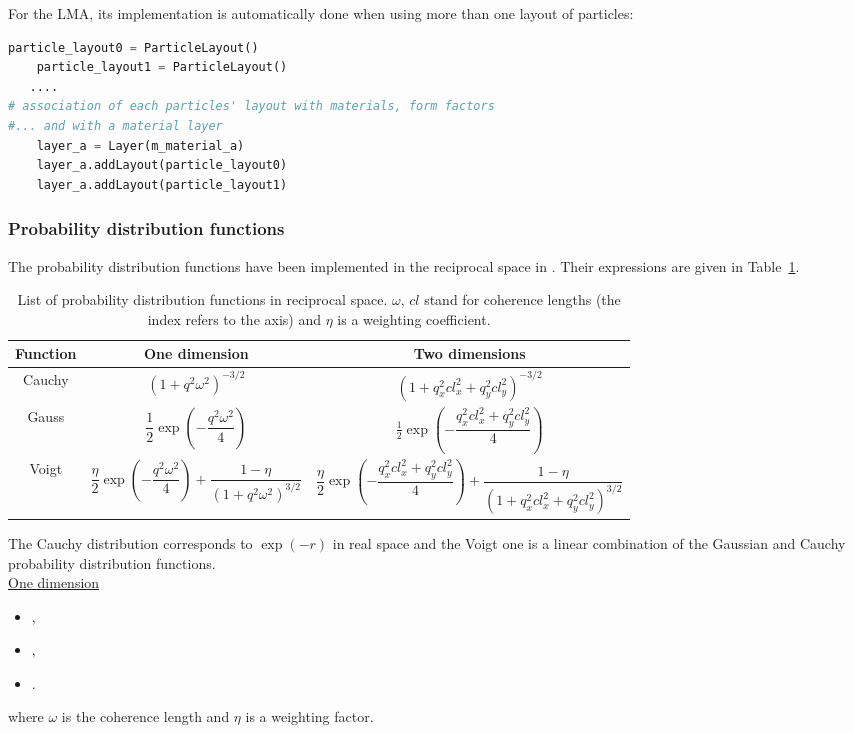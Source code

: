 For the LMA, its implementation is automatically done when using more than one layout of particles:
\begin{lstlisting}[language=python, style=eclipseboxed,numbers=none,nolol]
    particle_layout0 = ParticleLayout()
    particle_layout1 = ParticleLayout()
   ....
# association of each particles' layout with materials, form factors
#... and with a material layer
    layer_a = Layer(m_material_a)
    layer_a.addLayout(particle_layout0)
    layer_a.addLayout(particle_layout1)
\end{lstlisting}

\subsubsection{Probability distribution functions}\label{baftd}

The probability distribution functions have been implemented in the reciprocal space in \BornAgain. Their expressions are given in Table~\ref{table:pdf}.

\begin{table}[H]
\centering
\begin{tabular}{ccc}
\hline 
Function & One dimension & Two dimensions\\
\hline 
Cauchy & $(1+q^2\omega^2)^{-3/2}$ & $(1 + q_x^2 cl_x^2 + q_y^2 cl_y^2)^{-3/2}$ \\
Gauss & $\dfrac{1}{2}\exp(-\dfrac{q^2\omega^2}{4})$ & $\frac{1}{2}\exp\left(-\dfrac{q_x^2 cl_x^2+ q_y^2cl_y^2}{4}\right)$ \\
Voigt & $\dfrac{\eta}{2} \exp\left(-\dfrac{q^2\omega^2}{4}\right) + \dfrac{1 - \eta}{(1 + q^2\omega^2)^{3/2}}$ & $\dfrac{\eta}{2} \exp\left(-\dfrac{q_x^2 cl_x^2+ q_y^2cl_y^2}{4}\right)+ \dfrac{1 - \eta}{(1 + q_x^2 cl_x^2+ q_y^2cl_y^2)^{3/2}}$ \\
\hline
\end{tabular}
\caption{List of probability distribution functions in reciprocal space. $\omega$, $cl$ stand for coherence lengths (the index refers to the axis) and  $\eta$ is a weighting coefficient.}
\label{table:pdf}
\end{table}

The Cauchy distribution corresponds to $\exp(-r)$ in real space and the Voigt one  is a linear combination of the Gaussian and Cauchy probability distribution functions.\\

\noindent \underline{One dimension}
\begin{itemize}
\item {},
\item {},
\item {}.
\end{itemize}
where $\omega$ is the coherence length and $\eta$ is a weighting factor.\\

